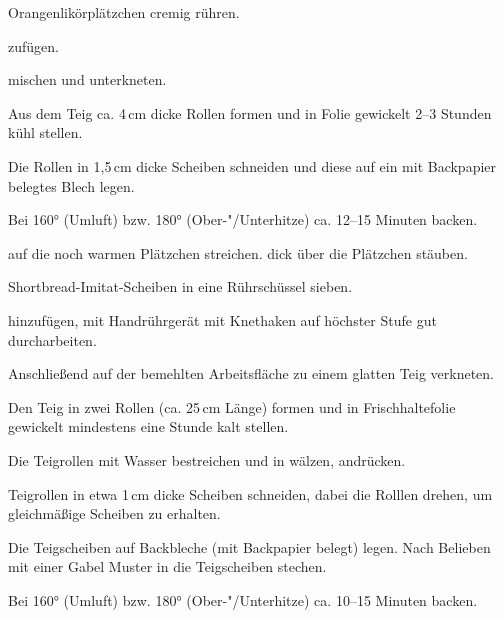 \begin{recipe}{Orangenlikörplätzchen}
  cremig rühren.

  zufügen.

  mischen und unterkneten.

  Aus dem Teig ca. 4\,cm dicke Rollen formen und in Folie gewickelt 2--3
  Stunden kühl stellen.

  Die Rollen in 1,5\,cm dicke Scheiben schneiden und diese auf ein mit
  Backpapier belegtes Blech legen.

  Bei 160° (Umluft) bzw. 180° (Ober-"/Unterhitze) ca. 12--15 Minuten backen.

  auf die noch warmen Plätzchen streichen.
  dick über die Plätzchen stäuben.
\end{recipe}



\begin{recipe}{Shortbread-Imitat-Scheiben}
  in eine Rührschüssel sieben.
  
  hinzufügen, mit Handrührgerät mit Knethaken auf höchster Stufe gut
  durcharbeiten.

  Anschließend auf der bemehlten Arbeitsfläche zu einem glatten Teig
  verkneten.
  
  Den Teig in zwei Rollen (ca. 25\,cm Länge) formen und in
  Frischhaltefolie gewickelt mindestens eine Stunde kalt stellen.

  Die Teigrollen mit Wasser bestreichen und in
  wälzen, andrücken.
  
  Teigrollen in etwa 1\,cm dicke Scheiben schneiden, dabei die Rolllen
  drehen, um gleichmäßige Scheiben zu erhalten.

  Die Teigscheiben auf Backbleche (mit Backpapier belegt) legen. Nach
  Belieben mit einer Gabel Muster in die Teigscheiben stechen.

  Bei 160° (Umluft) bzw. 180° (Ober-"/Unterhitze) ca. 10--15 Minuten backen.
\end{recipe}



